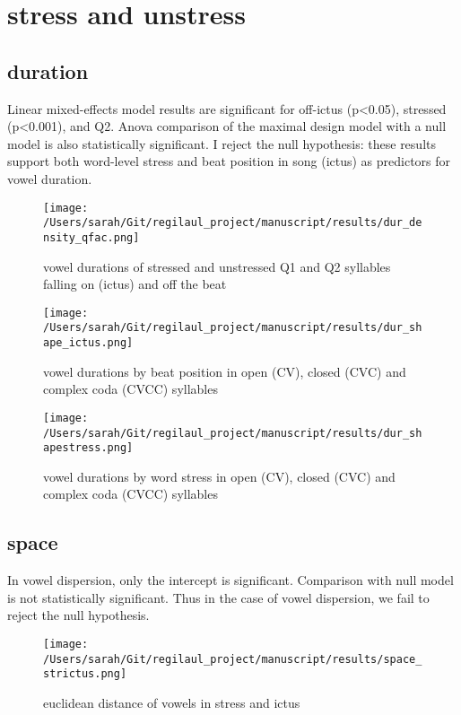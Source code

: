 \section{stress and unstress}


\subsection{duration}

Linear mixed-effects model results are significant for off-ictus (p<0.05), stressed (p<0.001), and Q2. Anova comparison of the maximal design model with a null model is also statistically significant. I reject the null hypothesis: these results support both word-level stress and beat position in song (ictus) as predictors for vowel duration. 

\begin{wrapfigure}{L}{0.5\textwidth}
\centering
\texttt{[image: /Users/sarah/Git/regilaul\_project/manuscript/results/dur\_density\_qfac.png]}
\caption{vowel durations of stressed and unstressed Q1 and Q2 syllables falling on (ictus) and off the beat}
\label{durstrick}
\end{wrapfigure}

\begin{wrapfigure}{R}{0.5\textwidth}
\centering
\texttt{[image: /Users/sarah/Git/regilaul\_project/manuscript/results/dur\_shape\_ictus.png]}
\caption{vowel durations by beat position in open (CV), closed (CVC) and complex coda (CVCC) syllables}
\label{ickdursh}
\end{wrapfigure}

\begin{wrapfigure}{L}{0.5\textwidth}
\centering
\texttt{[image: /Users/sarah/Git/regilaul\_project/manuscript/results/dur\_shapestress.png]}
\caption{vowel durations by word stress in open (CV), closed (CVC) and complex coda (CVCC) syllables}
\label{strdursh}

\end{wrapfigure}
%

\subsection{space}

In vowel dispersion, only the intercept is significant. Comparison with null model is not statistically significant. Thus in the case of vowel dispersion, we fail to reject the null hypothesis. 
\begin{wrapfigure}{R}{0.5\textwidth}
\centering
\texttt{[image: /Users/sarah/Git/regilaul\_project/manuscript/results/space\_strictus.png]}
\caption{euclidean distance of vowels in stress and ictus}
\label{spcstrick}

\end{wrapfigure}












